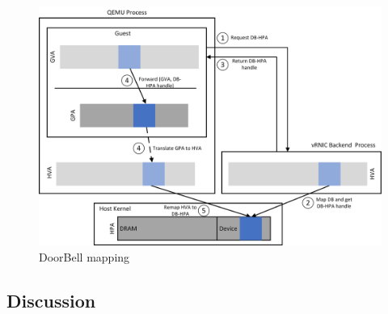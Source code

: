 \begin{figure}[!ht]
	\centering
	\includegraphics[width=1\linewidth]{images/db-map.png}
	\caption{DoorBell mapping}
	\label{fig:db-map}
\end{figure}





\subsection{Discussion}


